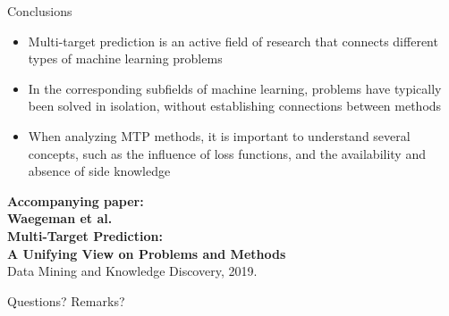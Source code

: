 \documentclass[]{beamer}
\begin{document}
\begin{frame}{Conclusions}

\begin{itemize}
\item Multi-target prediction is an active field of research that connects different types of machine learning problems
\item In the corresponding subfields of machine learning, problems have typically been solved in isolation, without establishing connections between methods
\item When analyzing MTP methods, it is important to understand several concepts, such as the influence of loss functions, and the availability and absence of side knowledge
\end{itemize}

\begin{center}
{\bf Accompanying paper: \\
Waegeman et al. \\ Multi-Target Prediction: \\ A Unifying View on Problems and Methods} \\
Data Mining and Knowledge Discovery, 2019. 

\end{center}

\end{frame}


\begin{frame}{Questions? Remarks?}

\end{frame}

%
%
\end{document}
